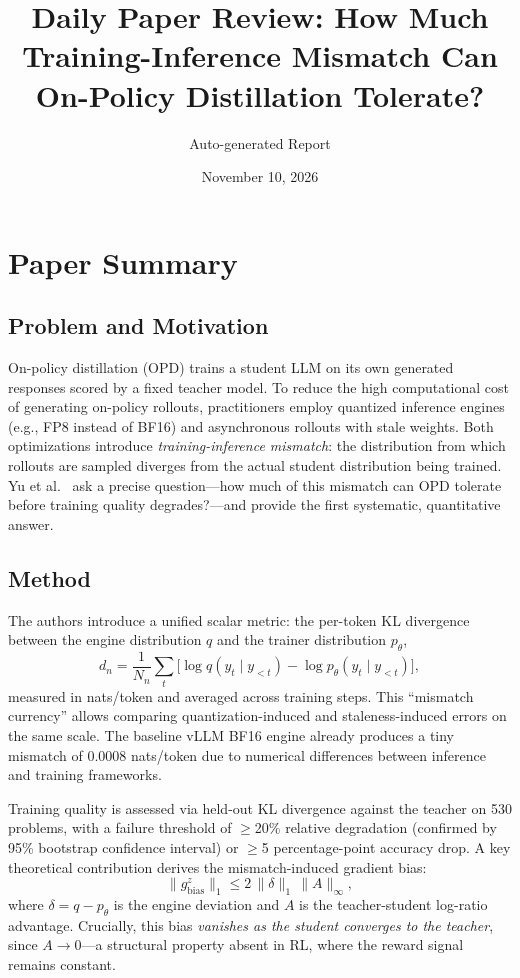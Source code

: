 \documentclass[11pt,a4paper]{article}
\title{Daily Paper Review: How Much Training-Inference Mismatch Can On-Policy Distillation Tolerate?}
\author{Auto-generated Report}
\date{November 10, 2026}
\begin{document}
\maketitle

\section{Paper Summary}

\subsection{Problem and Motivation}
On-policy distillation (OPD) trains a student LLM on its own generated responses scored by a fixed teacher model. To reduce the high computational cost of generating on-policy rollouts, practitioners employ quantized inference engines (e.g., FP8 instead of BF16) and asynchronous rollouts with stale weights. Both optimizations introduce \emph{training-inference mismatch}: the distribution from which rollouts are sampled diverges from the actual student distribution being trained. Yu et al.~\cite{yu2026mismatch} ask a precise question---how much of this mismatch can OPD tolerate before training quality degrades?---and provide the first systematic, quantitative answer.

\subsection{Method}
The authors introduce a unified scalar metric: the per-token KL divergence between the engine distribution $q$ and the trainer distribution $p_\theta$,
\[
  d_n = \frac{1}{N_n}\sum_{t} \bigl[\log q(y_t \mid y_{<t}) - \log p_\theta(y_t \mid y_{<t})\bigr],
\]
measured in nats/token and averaged across training steps. This ``mismatch currency'' allows comparing quantization-induced and staleness-induced errors on the same scale. The baseline vLLM BF16 engine already produces a tiny mismatch of 0.0008 nats/token due to numerical differences between inference and training frameworks.

Training quality is assessed via held-out KL divergence against the teacher on 530 problems, with a failure threshold of $\geq$20\% relative degradation (confirmed by 95\% bootstrap confidence interval) or $\geq$5 percentage-point accuracy drop. A key theoretical contribution derives the mismatch-induced gradient bias:
\[
  \|g^z_{\mathrm{bias}}\|_1 \leq 2\,\|\delta\|_1\,\|A\|_\infty,
\]
where $\delta = q - p_\theta$ is the engine deviation and $A$ is the teacher-student log-ratio advantage. Crucially, this bias \emph{vanishes as the student converges to the teacher}, since $A \to 0$---a structural property absent in RL, where the reward signal remains constant.
\end{document}
